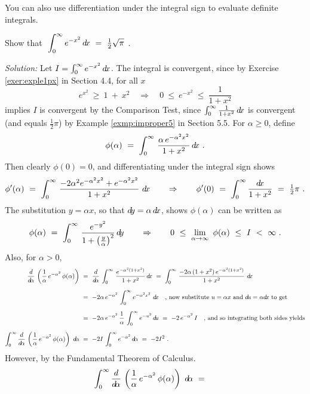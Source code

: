 You can also use differentiation under the integral sign to evaluate definite
integrals.
\newpage
\begin{exmp}\label{exmp:intexpx2}
\noindent Show that
$~\displaystyle\int_0^{\infty} e^{-x^2} \,d\!x ~=~ \tfrac{1}{2}\sqrt{\pi}~$.\vspace{1mm}
\par\noindent\emph{Solution:} Let $I = \int_0^{\infty} e^{-x^2} \,d\!x$. The
integral is convergent, since by Exercise \ref{exer:exple1px} in Section 4.4,
for all $x$
\[
e^{x^2} ~\ge~ 1 ~+~ x^2 \quad\Rightarrow\quad
0 ~\le~ e^{-x^2} ~\le~ \frac{1}{1 + x^2}
\]
implies $I$ is convergent by the Comparison Test, since
$\int_0^{\infty} \frac{1}{1 + x^2}\,d\!x$ is convergent (and equals
$\tfrac{1}{2}\pi$) by Example \ref{exmp:improper5} in Section 5.5. For
$\alpha \ge 0$, define
\[
\phi(\alpha) ~=~ \int_0^{\infty} \,\frac{\alpha\,e^{-\alpha^2 x^2}}{1 + x^2} \,d\!x ~.
\]
Then clearly $\phi(0) = 0$, and differentiating under the integral sign shows
\[
\phi'(\alpha) ~=~ \int_0^{\infty} \,\frac{-2\alpha^2 e^{-\alpha^2 x^2} + e^{-\alpha^2 x^2}}{1 + x^2}~d\!x
\qquad\Rightarrow\qquad
\phi'(0) ~=~ \int_0^{\infty} \frac{d\!x}{1 + x^2} ~=~ \tfrac{1}{2}\pi ~.
\]
The substitution $y = \alpha x$, so that $d\!y = \alpha\,d\!x$, shows
$\phi(\alpha)$ can be written as
\[
\phi(\alpha) ~=~ \int_0^{\infty} \,\frac{e^{-y^2}}{1 + \left(\tfrac{y}{\alpha}\right)^2} \,d\!y
\qquad\Rightarrow\qquad
0 ~\le~ \lim_{\alpha \to \infty}~ \phi(\alpha) ~\le~ I ~<~ \infty ~.
\]
Also, for $\alpha > 0$,
\begin{align*}
\frac{d}{\dalpha}\,\left(\frac{1}{\alpha}\,e^{-\alpha^2}\,\phi(\alpha)\right) ~&=~
\frac{d}{\dalpha}\,\int_0^{\infty} \,\frac{e^{-\alpha^2 (1+x^2)}}{1 + x^2} \,\dx
~=~ \int_0^{\infty} \,\frac{-2\alpha\,(1+x^2)\, e^{-\alpha^2 (1+x^2)}}{1 + x^2}~\dx\\[6pt]
&=~ -2\alpha\, e^{-\alpha^2}\,\int_0^{\infty} e^{-\alpha^2 x^2}~\dx \quad\text{,
now substitute $u = \alpha x$ and $\du = \alpha \dx$ to get}\\[6pt]
&=~ -2\alpha\, e^{-\alpha^2}\,\frac{1}{\alpha}\,\int_0^{\infty} e^{-u^2} \,\du
~=~ -2\, e^{-\alpha^2}\,I \quad\text{, and so integrating both sides yields}\\[6pt]
\int_0^{\infty} \frac{d}{\dalpha}\,\left(\frac{1}{\alpha}\,e^{-\alpha^2}\,\phi(\alpha)\right)~\dalpha ~&=~
-2I\,\int_0^{\infty} e^{-\alpha^2} \,\dalpha ~=~ -2I^2 ~.
\end{align*}
However, by the Fundamental Theorem of Calculus.
\begin{align*}
\int_0^{\infty} \frac{d}{\dalpha}\,\left(\frac{1}{\alpha}\,e^{-\alpha^2}\,\phi(\alpha)\right)~\dalpha ~&=~

\end{align*}
\end{exmp}
